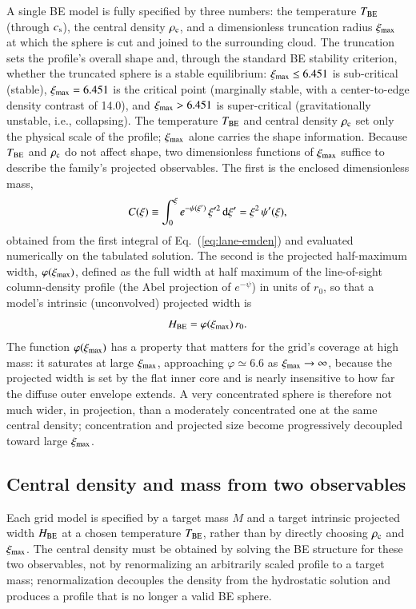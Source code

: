 \documentclass{aa}
\newcommand{\ximax}{\xi_{\rm max}}
\newcommand{\Tbe}{T_{\rm BE}}
\newcommand{\rhoc}{\rho_{\rm c}}
\newcommand{\cs}{c_{\rm s}}
\newcommand{\rzero}{r_{0}}
\begin{document}
A single BE model is fully specified by three numbers: the temperature
$\Tbe$ (through $\cs$), the central density $\rhoc$, and a dimensionless
truncation radius $\ximax$ at which the sphere is cut and joined to the
surrounding cloud. The truncation sets the profile's overall shape and,
through the standard BE stability criterion, whether the truncated sphere
is a stable equilibrium: $\ximax \le 6.451$ is sub-critical (stable),
$\ximax = 6.451$ is the critical point (marginally stable, with a
center-to-edge density contrast of 14.0), and $\ximax > 6.451$ is
super-critical (gravitationally unstable, i.e., collapsing). The
temperature $\Tbe$ and central density $\rhoc$ set only the physical scale
of the profile; $\ximax$ alone carries the shape information. Because
$\Tbe$ and $\rhoc$ do not affect shape, two dimensionless functions of
$\ximax$ suffice to describe the family's projected observables. The first
is the enclosed dimensionless mass,
\begin{equation}
  C(\xi)\equiv\int_{0}^{\xi} e^{-\psi(\xi')}\,\xi'^{2}\,{\rm d}\xi'
  = \xi^{2}\,\psi'(\xi),
  \label{eq:Cxi}
\end{equation}
obtained from the first integral of Eq.~(\ref{eq:lane-emden}) and evaluated
numerically on the tabulated solution. The second is the projected
half-maximum width, $\varphi(\ximax)$, defined as the full width at half
maximum of the line-of-sight column-density profile (the Abel projection
of $e^{-\psi}$) in units of $r_0$, so that a model's intrinsic (unconvolved)
projected width is
\begin{equation}
  H_{\rm BE} = \varphi(\ximax)\,\rzero .
  \label{eq:phidef}
\end{equation}
The function $\varphi(\ximax)$ has a property that matters for the grid's
coverage at high mass: it saturates at large $\ximax$, approaching
$\varphi \simeq 6.6$ as $\ximax \to \infty$, because the projected width is
set by the flat inner core and is nearly insensitive to how far the
diffuse outer envelope extends. A very concentrated sphere is therefore not
much wider, in projection, than a moderately concentrated one at the same
central density; concentration and projected size become progressively
decoupled toward large $\ximax$.

\subsection{Central density and mass from two observables}
\label{sec:inversion}

Each grid model is specified by a target mass $M$ and a target intrinsic
projected width $H_{\rm BE}$ at a chosen temperature
$\Tbe$, rather than by directly choosing $\rhoc$ and $\ximax$. The central
density must be obtained by solving the BE structure for these two
observables, not by renormalizing an arbitrarily scaled profile to a
target mass; renormalization decouples the density from the hydrostatic
solution and produces a profile that is no longer a valid BE sphere.
\end{document}
